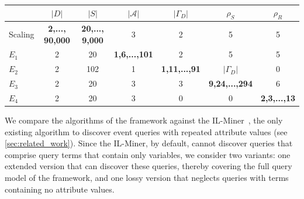 \begin{table}[t]
	\scriptsize
	\caption{}
	\label{tab:synt-scenarios}
	\vspace{-1.2em}
	\begin{tabular}{lcccccc}
		\toprule
		                                          & $|D|$    &
		$|S|$      & $|\mathcal{A}|$ &    $|\Gamma_D|$        &
		$\rho_S$        &   $\rho_R$         \\
		\midrule
		
		Scaling &  \textbf{2,..., 90,000}         & \textbf{20,...,
		9,000}         &
		3 & 2          & 5          & 5          \\
		\midrule
		$E_1$              & 2          & 20         &
		\textbf{1,6,...,101} & 2          & 5          & 5          \\
		$E_2$ & 2          & 102        & 1          &
		\textbf{1,11,...,91} &     $|\Gamma_D|$     & 0          \\
		$E_3$ & 2          & 20         & 3          & 3          &
		\textbf{9,24,...,294} & 6       \\
		$E_4$  & 2          & 20         & 3          & 0          &
		0          & \textbf{2,3,...,13} \\
		\bottomrule
	\end{tabular}
	\vspace{-1.4em}
\end{table}


We compare the algorithms of the \sys{} framework against the
IL-Miner~\cite{ilminer}, the only existing algorithm to discover event
queries with repeated attribute values (see \autoref{sec:related_work}).
Since the IL-Miner, by default, cannot discover queries that comprise query
terms that contain only variables, we consider two variants: one extended
version that can discover these queries, thereby covering the full query
model of the \sys{} framework, and one lossy version that neglects queries
with terms containing no attribute values.

